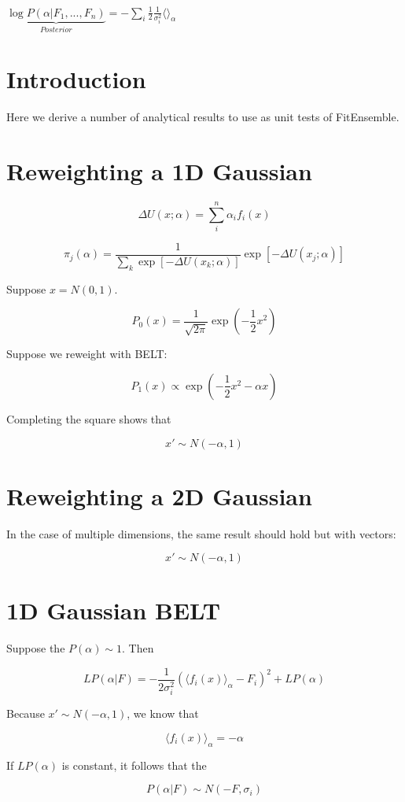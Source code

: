 \documentclass[12pt]{article}
\begin{document}
$\underbrace{\log P(\alpha| F_1, ..., F_n)}_{Posterior} = -\sum_i \frac{1}{2} \frac{1}{\sigma_i^2} \langle \rangle_{\alpha}$

\section{Introduction}

Here we derive a number of analytical results to use as unit tests of FitEnsemble.  


\section{Reweighting a 1D Gaussian}

$$\Delta U(x;\alpha) = \sum_i^n \alpha_i f_i(x)$$


$$\pi_j(\alpha) = \frac{1}{\sum_k \exp[-\Delta U(x_k;\alpha)]} \exp[-\Delta U(x_j;\alpha)]$$


Suppose $x = N(0,1)$.  

$$P_0(x)  = \frac{1}{\sqrt{2 \pi}} \exp(-\frac{1}{2} x^2)$$

Suppose we reweight with BELT:

$$P_1(x) \propto \exp(-\frac{1}{2} x^2 - \alpha x)$$

Completing the square shows that

$$x' \sim N(-\alpha, 1)$$

\section{Reweighting a 2D Gaussian}

In the case of multiple dimensions, the same result should hold but with vectors:

$$x' \sim N(-\alpha, 1)$$

\section{1D Gaussian BELT}

Suppose the $P(\alpha) \sim 1$.  Then

$$LP(\alpha|F) = -\frac{1}{2\sigma_i^2}(\langle f_i(x)\rangle _\alpha - F_i)^2 + LP(\alpha)$$

Because $x' \sim N(-\alpha, 1)$, we know that

$$\langle f_i(x)\rangle _\alpha = -\alpha$$

If $LP(\alpha)$ is constant, it follows that the

$$P(\alpha | F) \sim N(-F, \sigma_i)$$
\end{document}

